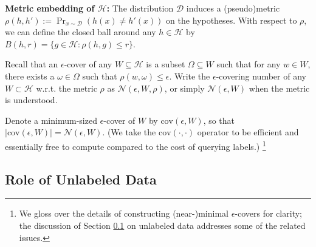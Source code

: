 \documentclass{article}[12pt]
\newcommand{\authcmt}[2]{\ifnum\Comments=1\textcolor{#1}{#2}\fi}
\newcommand{\akshay}[1]{\authcmt{red}      {[AB: #1]}}
\theoremstyle{named}
\newcommand{\vr}{\mathbf{r}}
\DeclareMathOperator{\Prtxt}{Pr}
\newcommand{\abs}[1]{\left| #1 \right|}
\newcommand{\prp}[2]{\Prtxt_{#2} \left(#1\right)}
\newcommand{\cov}[1]{\mbox{cov}\left(#1\right)}
\newcommand{\cH}{\mathcal{H}}
\newcommand{\cD}{\mathcal{D}}
\newcommand{\cN}{\mathcal{N}}
\begin{document}
{\bf Metric embedding of $\cH$:}
The distribution $\cD$ induces a (pseudo)metric $\rho(h, h') := \prp{h(x) \neq h'(x)}{x \sim \cD}$ on the hypotheses.
With respect to $\rho$, we can define the closed ball around any $h \in \cH$ by $B(h, r) = \{ g \in \cH : \rho(h, g) \leq r \}$. 

Recall that an $\epsilon$-cover of any $W \subseteq \cH$ is a subset $\Omega \subseteq W$ 
such that for any $w \in W$, 
there exists a $\omega \in \Omega$ such that $\rho(w, \omega) \leq \epsilon$. 
Write the $\epsilon$-covering number of any $W \subset \cH$ w.r.t. the metric $\rho$ 
as $\cN (\epsilon, W, \rho)$, or simply $\cN (\epsilon, W)$ when the metric is understood.

Denote a minimum-sized $\epsilon$-cover of $W$ by $\cov{\epsilon, W}$, so that $\abs{\cov{\epsilon, W}} = \cN(\epsilon, W)$. 
(We take the $\cov{\cdot, \cdot}$ operator to be efficient and essentially free to compute compared to the cost of querying labels.)
\footnote{We gloss over the details of constructing (near-)minimal $\epsilon$-covers for clarity; 
the discussion of Section \ref{sec:unlabeleddata} on unlabeled data addresses some of the related issues.}


%
%





\subsection{Role of Unlabeled Data}
\label{sec:unlabeleddata}
\end{document}
